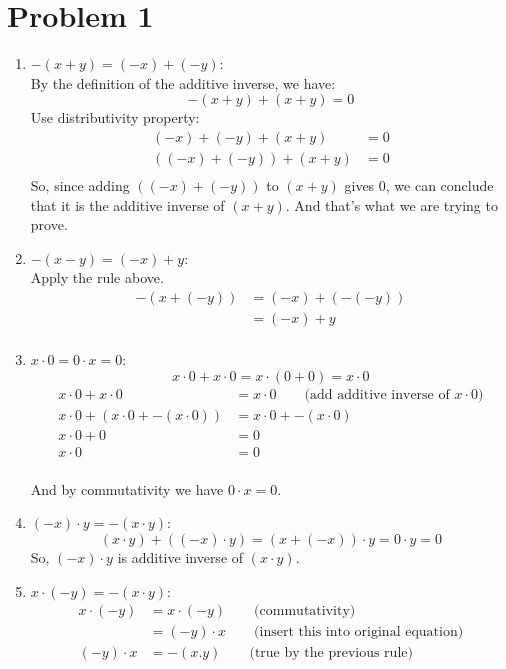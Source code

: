 \documentclass{article}
\begin{document}
\section*{Problem 1}
\begin{enumerate}
    \item $-(x + y) = (-x) + (-y)$: \\
    By the definition of the additive inverse, we have:
    \[
    -(x + y) + (x + y) = 0
    \]
   Use distributivity property:
   \begin{align*}
      (-x) + (-y) + (x + y) &= 0 \\
      ((-x) + (-y)) + (x + y) &= 0 \\
   \end{align*}
   So, since adding \(((-x) + (-y))\) to \((x + y)\) gives \(0\), we can conclude that it is the additive inverse of \((x + y)\).
   And that's what we are trying to prove.

    \item $-(x - y) = (-x) + y$: \\
    Apply the rule above.
    \begin{align*}
      -(x + (-y)) &= (-x) + (-(-y)) \\
      &= (-x) + y \\
    \end{align*}

    \item $x \cdot 0 = 0 \cdot x = 0$: \\
    \[
      x \cdot 0 + x\cdot 0 = x \cdot (0 + 0) = x \cdot 0
    \]
    \begin{align*}
      x \cdot 0 + x\cdot 0 &= x \cdot 0 \qquad \text{(add additive inverse of \(x\cdot 0\))} \\
      x \cdot 0 + (x\cdot 0 + -(x \cdot 0)) &= x \cdot 0 + -(x \cdot 0) \\
      x \cdot 0 + 0 &= 0 \\
      x \cdot 0 &= 0 \\
   \end{align*}

   And by commutativity we have \(0 \cdot x = 0\).

    \item $(-x) \cdot y = -(x \cdot y)$: \\
   \[
      (x \cdot y) + ((-x) \cdot y) = (x + (-x)) \cdot y = 0 \cdot y = 0
   \]
   So, \((-x) \cdot y\) is additive inverse of \((x \cdot y)\).

    \item $x \cdot (-y) = -(x \cdot y)$: \\
    \begin{align*}
      x \cdot (-y) &= x \cdot (-y) \qquad \text{(commutativity)} \\
      &= (-y) \cdot x  \qquad \text{(insert this into original equation)}\\
      (-y) \cdot x &= -(x.y) \qquad \text{(true by the previous rule)} \\
    \end{align*}


\end{enumerate}
\end{document}
